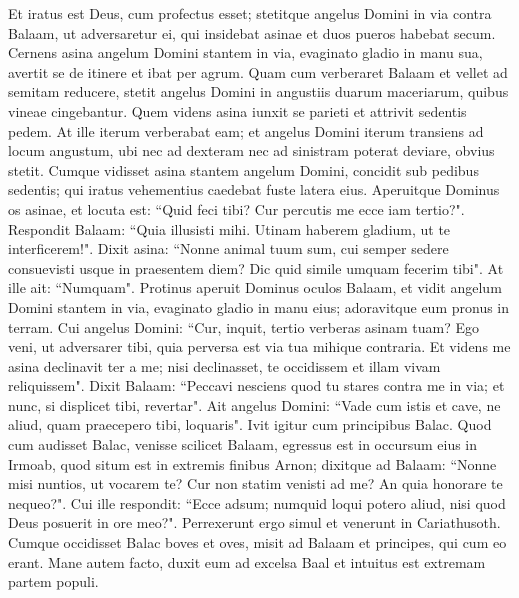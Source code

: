 \begin{biblechapter}
\verse Et iratus est Deus, cum profectus esset; stetitque angelus Domini in via contra Balaam, ut adversaretur ei, qui insidebat asinae et duos pueros habebat secum. 
\verse Cernens asina angelum Domini stantem in via, evaginato gladio in manu sua, avertit se de itinere et ibat per agrum. Quam cum verberaret Balaam et vellet ad semitam reducere, 
\verse stetit angelus Domini in angustiis duarum maceriarum, quibus vineae cingebantur. 
\verse Quem videns asina iunxit se parieti et attrivit sedentis pedem. At ille iterum verberabat eam; 
\verse et angelus Domini iterum transiens ad locum angustum, ubi nec ad dexteram nec ad sinistram poterat deviare, obvius stetit. 
\verse Cumque vidisset asina stantem angelum Domini, concidit sub pedibus sedentis; qui iratus vehementius caedebat fuste latera eius. 
\verse Aperuitque Dominus os asinae, et locuta est: “Quid feci tibi? Cur percutis me ecce iam tertio?". 
\verse Respondit Balaam: “Quia illusisti mihi. Utinam haberem gladium, ut te interficerem!". 
\verse Dixit asina: “Nonne animal tuum sum, cui semper sedere consuevisti usque in praesentem diem? Dic quid simile umquam fecerim tibi". At ille ait: “Numquam". 
\verse Protinus aperuit Dominus oculos Balaam, et vidit angelum Domini stantem in via, evaginato gladio in manu eius; adoravitque eum pronus in terram. 
\verse Cui angelus Domini: “Cur, inquit, tertio verberas asinam tuam? Ego veni, ut adversarer tibi, quia perversa est via tua mihique contraria. 
\verse Et videns me asina declinavit ter a me; nisi declinasset, te occidissem et illam vivam reliquissem". 
\verse Dixit Balaam: “Peccavi nesciens quod tu stares contra me in via; et nunc, si displicet tibi, revertar". 
\verse Ait angelus Domini: “Vade cum istis et cave, ne aliud, quam praecepero tibi, loquaris". Ivit igitur cum principibus Balac. 
\verse Quod cum audisset Balac, venisse scilicet Balaam, egressus est in occursum eius in Irmoab, quod situm est in extremis finibus Arnon; 
\verse dixitque ad Balaam: “Nonne misi nuntios, ut vocarem te? Cur non statim venisti ad me? An quia honorare te nequeo?". 
\verse Cui ille respondit: “Ecce adsum; numquid loqui potero aliud, nisi quod Deus posuerit in ore meo?". 
\verse Perrexerunt ergo simul et venerunt in Cariathusoth. 
\verse Cumque occidisset Balac boves et oves, misit ad Balaam et principes, qui cum eo erant. 
\verse Mane autem facto, duxit eum ad excelsa Baal et intuitus est extremam partem populi. 
\end{biblechapter}

